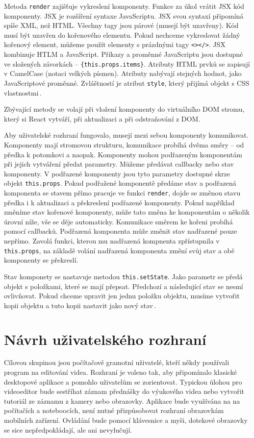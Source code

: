 Metoda \texttt{render} zajišťuje vykreslení komponenty. Funkce za úkol vrátit JSX kód komponenty. JSX je rozšíření syntaxe JavaScriptu. JSX svou syntaxí připomíná spíše XML, než HTML. Všechny tagy jsou párové (musejí být uzavřeny). Kód musí být uzavřen do kořenového elementu. Pokud nechceme vykreslovat žádný kořenový element, můžeme použít elementy s prázdnými tagy \texttt{<></>}. JSX kombinuje HTLM a JavaScript. Příkazy a proměnné JavaScriptu jsou dostupné ve složených závorkách -- \texttt{\{this.props.items\}}. Atributy HTML prvků se zapisují v CamelCase (notaci velkých písmen). Atributy nabývají stejných hodnot, jako JavaScriptové proměnné. Zvláštností je atribut \texttt{style}, který přijímá objekt s CSS vlastnostmi\,\cite{jsx}.

Zbývající metody se volají při vložení komponenty do virtuálního DOM stromu, který si React vytváří, při aktualizaci a při odstraňování z DOM.

Aby uživatelské rozhraní fungovalo, musejí mezi sebou komponenty komunikovat. Komponenty mají stromovou strukturu, komunikace probíhá dvěma směry -- od předka k potomkovi a naopak. Komponenty mohou podřazeným komponentám při jejich vytváření předat parametry. Můžeme předávat callbacky nebo stav komponenty. V podřazené komponenty jsou tyto parametry dostupné skrze objekt \texttt{this.props}. Pokud podřažené komponentě předáme stav a podřazená komponenta se stavem přímo pracuje ve funkci \texttt{render}, dojde se změnou stavu předka i k aktualizaci a překreslení podřazené komponenty. Pokud například změníme stav kořenové komponenty, může tato změna  ke komponentám o několik úrovní níže, vše se děje automaticky. Komunikace směrem ke kořeni probíhá pomocí callbacků. Podřazená komponenta může změnit stav nadřazené pouze nepřímo. Zavolá funkci, kterou mu nadřazená kompnenta zpřístupnila v \texttt{this.props}, na základě volání nadřazená komponenta změní svůj stav a obě komponenty se překreslí.

Stav komponety se nastavuje metodou \texttt{this.setState}. Jako parametr se předá objekt s položkami, které se mají přepsat. Předchozí a následující stav se nesmí ovlivňovat. Pokud chceme upravit jen jednu položku objektu, musíme vytvořit kopii objektu a tuto kopii nastavit jako nový stav\,\cite{react}.

\section{Návrh uživatelského rozhraní}
Cílovou skupinou jsou počítačově gramotní uživatelé, kteří někdy používali program na editování videa. Rozhraní je voleno tak, aby připomínalo klasické desktopové aplikace a pomohlo uživatelům se zorientovat. Typickou úlohou pro videoeditor bude sestříhat záznam přednášky do výukového videa nebo vytvořit tutoriál ze záznamu z kamery nebo obrazovky. Aplikace bude využívána na na počítačích a noteboocích, není nutné přizpůsobovat rozhraní obrazovkám mobilních zařízení. Ovládání bude pomocí klávesnice a myši, dotekové obrazovky se sice nepředpokládají, ale ani nevylučují.

